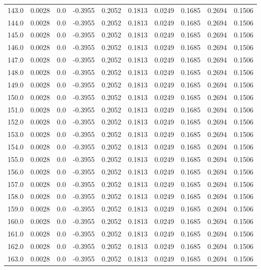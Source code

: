 \begin{longtable}{lrrrrrrrrr}
143.0 & 0.0028 & 0.0 & -0.3955 & 0.2052 & 0.1813 & 0.0249 & 0.1685 & 0.2694 & 0.1506 \\
144.0 & 0.0028 & 0.0 & -0.3955 & 0.2052 & 0.1813 & 0.0249 & 0.1685 & 0.2694 & 0.1506 \\
145.0 & 0.0028 & 0.0 & -0.3955 & 0.2052 & 0.1813 & 0.0249 & 0.1685 & 0.2694 & 0.1506 \\
146.0 & 0.0028 & 0.0 & -0.3955 & 0.2052 & 0.1813 & 0.0249 & 0.1685 & 0.2694 & 0.1506 \\
147.0 & 0.0028 & 0.0 & -0.3955 & 0.2052 & 0.1813 & 0.0249 & 0.1685 & 0.2694 & 0.1506 \\
148.0 & 0.0028 & 0.0 & -0.3955 & 0.2052 & 0.1813 & 0.0249 & 0.1685 & 0.2694 & 0.1506 \\
149.0 & 0.0028 & 0.0 & -0.3955 & 0.2052 & 0.1813 & 0.0249 & 0.1685 & 0.2694 & 0.1506 \\
150.0 & 0.0028 & 0.0 & -0.3955 & 0.2052 & 0.1813 & 0.0249 & 0.1685 & 0.2694 & 0.1506 \\
151.0 & 0.0028 & 0.0 & -0.3955 & 0.2052 & 0.1813 & 0.0249 & 0.1685 & 0.2694 & 0.1506 \\
152.0 & 0.0028 & 0.0 & -0.3955 & 0.2052 & 0.1813 & 0.0249 & 0.1685 & 0.2694 & 0.1506 \\
153.0 & 0.0028 & 0.0 & -0.3955 & 0.2052 & 0.1813 & 0.0249 & 0.1685 & 0.2694 & 0.1506 \\
154.0 & 0.0028 & 0.0 & -0.3955 & 0.2052 & 0.1813 & 0.0249 & 0.1685 & 0.2694 & 0.1506 \\
155.0 & 0.0028 & 0.0 & -0.3955 & 0.2052 & 0.1813 & 0.0249 & 0.1685 & 0.2694 & 0.1506 \\
156.0 & 0.0028 & 0.0 & -0.3955 & 0.2052 & 0.1813 & 0.0249 & 0.1685 & 0.2694 & 0.1506 \\
157.0 & 0.0028 & 0.0 & -0.3955 & 0.2052 & 0.1813 & 0.0249 & 0.1685 & 0.2694 & 0.1506 \\
158.0 & 0.0028 & 0.0 & -0.3955 & 0.2052 & 0.1813 & 0.0249 & 0.1685 & 0.2694 & 0.1506 \\
159.0 & 0.0028 & 0.0 & -0.3955 & 0.2052 & 0.1813 & 0.0249 & 0.1685 & 0.2694 & 0.1506 \\
160.0 & 0.0028 & 0.0 & -0.3955 & 0.2052 & 0.1813 & 0.0249 & 0.1685 & 0.2694 & 0.1506 \\
161.0 & 0.0028 & 0.0 & -0.3955 & 0.2052 & 0.1813 & 0.0249 & 0.1685 & 0.2694 & 0.1506 \\
162.0 & 0.0028 & 0.0 & -0.3955 & 0.2052 & 0.1813 & 0.0249 & 0.1685 & 0.2694 & 0.1506 \\
163.0 & 0.0028 & 0.0 & -0.3955 & 0.2052 & 0.1813 & 0.0249 & 0.1685 & 0.2694 & 0.1506 \\

\end{longtable}
